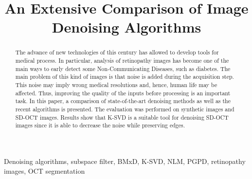 \documentclass[12pt, conference]{IEEEtran}
\begin{document}
\title{An Extensive Comparison of Image Denoising Algorithms}
\author{
}
\maketitle
\thispagestyle{plain}
\pagestyle{plain}

\begin{abstract}
The advance of new technologies of this century has allowed to develop tools for medical process. In particular, analysis of retinopathy images has become one of the main ways to early detect some Non-Communicating Diseases, such as diabetes. The main problem of this kind of images is that noise is added during the acquisition step. This noise may imply wrong medical resolutions and, hence, human life may be affected. Thus, improving the quality of the inputs before processing is an important task. In this paper, a comparison of state-of-the-art denoising methods as well as the recent algorithms is presented. The evaluation was performed on synthetic images and SD-OCT images. Results show that K-SVD is a suitable tool for denoising SD-OCT images since it is able to decrease the noise while preserving edges.
\end{abstract}

\begin{IEEEkeywords}
Denoising algorithms, subspace filter, BMxD, K-SVD, NLM, PGPD, retinopathy images, OCT segmentation
\end{IEEEkeywords}
\IEEEpeerreviewmaketitle










\end{document}

